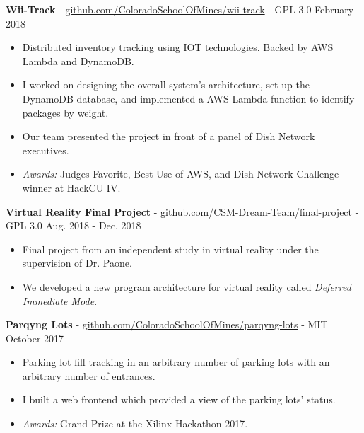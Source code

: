 \documentclass[10pt,letterpaper]{article}
\begin{document}
\textbf{Wii-Track} -
\href{https://github.com/ColoradoSchoolOfMines/wii-track}{github.com/ColoradoSchoolOfMines/wii-track}
- GPL 3.0 \hfill February 2018
\begin{itemize}
    \item Distributed inventory tracking using IOT technologies. Backed by AWS
        Lambda and DynamoDB.
    \item I worked on designing the overall system's architecture, set up the
        DynamoDB database, and implemented a AWS Lambda function to identify
        packages by weight.
    \item Our team presented the project in front of a panel of Dish Network
        executives.
    \item \textit{Awards:} Judges Favorite, Best Use of AWS, and Dish Network
        Challenge winner at HackCU IV.
\end{itemize}


\textbf{Virtual Reality Final Project} -
\href{https://github.com/CSM-Dream-Team/final-project}{github.com/CSM-Dream-Team/final-project}
- GPL 3.0 \hfill Aug. 2018 - Dec. 2018
\begin{itemize}
    \item Final project from an independent study in virtual reality under the
        supervision of Dr. Paone.
    \item We developed a new program architecture for virtual reality called
        \textit{Deferred Immediate Mode}.
\end{itemize}

\textbf{Parqyng Lots} -
\href{https://github.com/ColoradoSchoolOfMines/parqyng-lots}{github.com/ColoradoSchoolOfMines/parqyng-lots}
- MIT \hfill October 2017
\begin{itemize}
    \item Parking lot fill tracking in an arbitrary number of parking lots with
        an arbitrary number of entrances.
    \item I built a web frontend which provided a view of the parking lots'
        status.
    \item \textit{Awards:} Grand Prize at the Xilinx Hackathon 2017.
\end{itemize}
\end{document}
